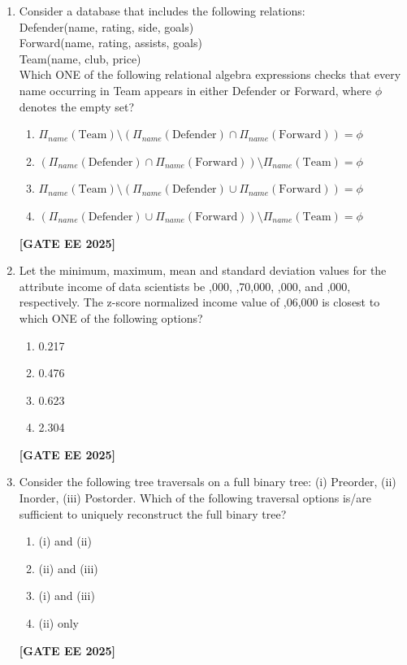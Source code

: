 \documentclass[journal]{IEEEtran}
\newcommand{\qfooter}{%
  \begin{flushright}\footnotesize\textbf{[GATE EE 2025]}\end{flushright}\vspace{1em}%
}
\begin{document}
\begin{enumerate}
\item Consider a database that includes the following relations:\\
Defender(name, rating, side, goals)\\
Forward(name, rating, assists, goals)\\
Team(name, club, price)\\
Which ONE of the following relational algebra expressions checks that every name occurring in Team appears in either Defender or Forward, where $\phi$ denotes the empty set?

\begin{enumerate}
\item $\Pi_{name}(\text{Team}) \setminus (\Pi_{name}(\text{Defender}) \cap \Pi_{name}(\text{Forward})) = \phi$
\item $(\Pi_{name}(\text{Defender}) \cap \Pi_{name}(\text{Forward})) \setminus \Pi_{name}(\text{Team}) = \phi$
\item $\Pi_{name}(\text{Team}) \setminus (\Pi_{name}(\text{Defender}) \cup \Pi_{name}(\text{Forward})) = \phi$
\item $(\Pi_{name}(\text{Defender}) \cup \Pi_{name}(\text{Forward})) \setminus \Pi_{name}(\text{Team}) = \phi$
\end{enumerate} \qfooter


\item Let the minimum, maximum, mean and standard deviation values for the attribute income of data scientists be ,000, ,70,000, ,000, and ,000, respectively. The z-score normalized income value of ,06,000 is closest to which ONE of the following options?
\begin{multicols}{2}
\begin{enumerate}
\item 0.217
\item 0.476
\item 0.623
\item 2.304
\end{enumerate} \qfooter
\end{multicols}

\item Consider the following tree traversals on a full binary tree: (i) Preorder, (ii) Inorder, (iii) Postorder. Which of the following traversal options is/are sufficient to uniquely reconstruct the full binary tree?
\begin{multicols}{2}
\begin{enumerate}
\item (i) and (ii)
\item (ii) and (iii)
\item (i) and (iii)
\item (ii) only
\end{enumerate} \qfooter
\end{multicols}


\end{enumerate}
\end{document}
